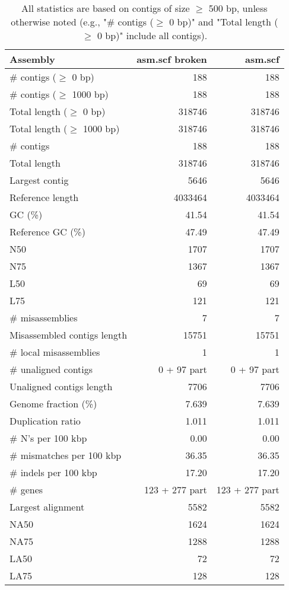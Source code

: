 \documentclass[12pt,a4paper]{article}
\begin{document}
\begin{table}[ht]
\begin{center}
\caption{All statistics are based on contigs of size $\geq$ 500 bp, unless otherwise noted (e.g., "\# contigs ($\geq$ 0 bp)" and "Total length ($\geq$ 0 bp)" include all contigs).}
\begin{tabular}{|l*{2}{|r}|}
\hline
Assembly & asm.scf broken & asm.scf \\ \hline
\# contigs ($\geq$ 0 bp) & 188 & 188 \\ \hline
\# contigs ($\geq$ 1000 bp) & 188 & 188 \\ \hline
Total length ($\geq$ 0 bp) & 318746 & 318746 \\ \hline
Total length ($\geq$ 1000 bp) & 318746 & 318746 \\ \hline
\# contigs & 188 & 188 \\ \hline
Total length & 318746 & 318746 \\ \hline
Largest contig & 5646 & 5646 \\ \hline
Reference length & 4033464 & 4033464 \\ \hline
GC (\%) & 41.54 & 41.54 \\ \hline
Reference GC (\%) & 47.49 & 47.49 \\ \hline
N50 & 1707 & 1707 \\ \hline
N75 & 1367 & 1367 \\ \hline
L50 & 69 & 69 \\ \hline
L75 & 121 & 121 \\ \hline
\# misassemblies & 7 & 7 \\ \hline
Misassembled contigs length & 15751 & 15751 \\ \hline
\# local misassemblies & 1 & 1 \\ \hline
\# unaligned contigs & 0 + 97 part & 0 + 97 part \\ \hline
Unaligned contigs length & 7706 & 7706 \\ \hline
Genome fraction (\%) & 7.639 & 7.639 \\ \hline
Duplication ratio & 1.011 & 1.011 \\ \hline
\# N's per 100 kbp & 0.00 & 0.00 \\ \hline
\# mismatches per 100 kbp & 36.35 & 36.35 \\ \hline
\# indels per 100 kbp & 17.20 & 17.20 \\ \hline
\# genes & 123 + 277 part & 123 + 277 part \\ \hline
Largest alignment & 5582 & 5582 \\ \hline
NA50 & 1624 & 1624 \\ \hline
NA75 & 1288 & 1288 \\ \hline
LA50 & 72 & 72 \\ \hline
LA75 & 128 & 128 \\ \hline
\end{tabular}
\end{center}
\end{table}
\end{document}
